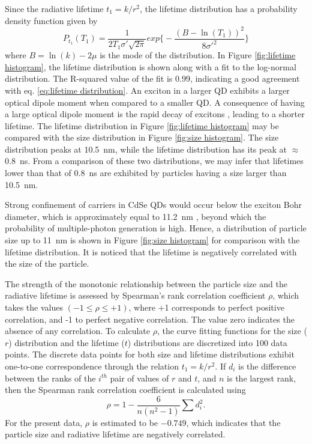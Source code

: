 \documentclass[%
 aip,
 amsmath,amssymb,
 reprint,%
]{revtex4-1}
\begin{document}
Since the radiative lifetime $t_1 = k/r^2$, the lifetime distribution has a probability density function given by 
\begin{equation}
    P_{t_1}(T_1) = \frac{1}{2T_1 \sigma'  \sqrt {2 \pi}} exp \Biggl \{- \frac{(B - \ln(T_1))^2}{8 \sigma'^2} \Biggr \}
    \label{eq:lifetime distribution}
\end{equation}
where $B=\ln(k) - 2\mu$ is the mode of the distribution.  In Figure \ref{fig:lifetime histogram}, the lifetime distribution is shown along with a fit to the log-normal distribution. The R-squared value of the fit is 0.99, indicating a good agreement with eq. \ref{eq:lifetime distribution}. An exciton in a larger QD exhibits a larger optical dipole moment when compared to a smaller QD. A consequence of having a large optical dipole moment is the rapid decay of excitons \cite{MM}, leading to a shorter lifetime. The lifetime distribution in Figure \ref{fig:lifetime histogram} may be compared with the size distribution in Figure \ref{fig:size histogram}. The size distribution  peaks at 10.5~nm, while the lifetime distribution has its peak at $\approx$ 0.8~ns. From a comparison of these two distributions, we may infer that lifetimes lower than that of 0.8~ns are exhibited by particles having a size larger than 10.5~nm.

Strong confinement of carriers in CdSe QDs would occur below the exciton Bohr diameter, which is approximately equal to 11.2~nm \cite{MM}, beyond which the probability of multiple-photon generation is high. Hence, a distribution of particle size up to 11~nm is shown in Figure \ref{fig:size histogram} for  comparison with the lifetime distribution. It is noticed that the lifetime is negatively correlated with the size of the particle. 

The strength of the monotonic relationship between the particle size and the radiative lifetime is assessed by Spearman's rank correlation coefficient $\rho$, which takes the values $(-1 \leq \rho \leq +1)$, where +1 corresponds to perfect positive correlation, and -1  to perfect negative correlation. The value zero indicates the absence of any correlation. To calculate $\rho$, the curve fitting functions for the size ($r$) distribution and the lifetime ($t$) distributions are discretized into 100 data points.  The discrete data points for both size and lifetime distributions exhibit one-to-one correspondence through the relation $t_1 = k/r^2$. If $d_i$ is the difference between the ranks of the $i^{th}$ pair of values of $r$ and $t$, and $n$ is the largest rank, then the Spearman rank correlation coefficient is calculated using 
\begin{equation}
    \rho = 1 - \frac{6}{n(n^2 -1)}\sum d_i^2. 
\end{equation}
For the present data, $\rho$ is estimated to be  $-0.749$, which indicates that the particle size and radiative lifetime are negatively correlated.
\end{document}
